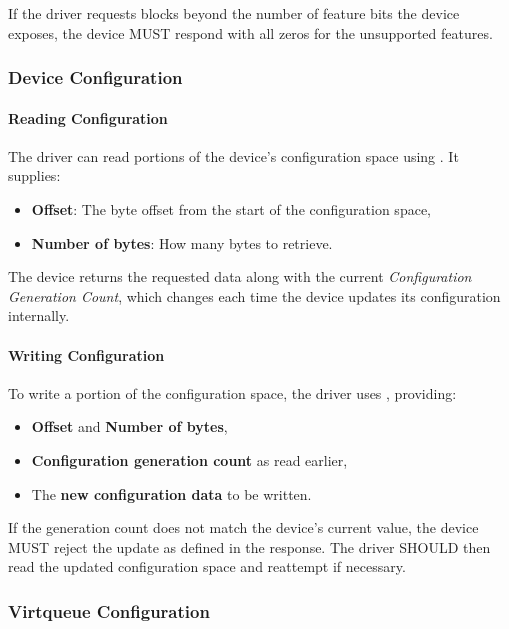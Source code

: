 If the driver requests blocks beyond the number of feature bits the device
exposes, the device MUST respond with all zeros for the unsupported
features.

\subsubsection{Device Configuration}
\label{sec:Virtio Transport Options / Virtio Over Messages / Device Initialization / Device Configuration}

\paragraph{Reading Configuration}

The driver can read portions of the device's configuration space using
. It supplies:
\begin{itemize}
  \item \textbf{Offset}: The byte offset from the start of the configuration
    space,
  \item \textbf{Number of bytes}: How many bytes to retrieve.
\end{itemize}
The device returns the requested data along with the current \emph{Configuration
Generation Count}, which changes each time the device updates its configuration
internally.

\paragraph{Writing Configuration}

To write a portion of the configuration space, the driver uses
, providing:
\begin{itemize}
  \item \textbf{Offset} and \textbf{Number of bytes},
  \item \textbf{Configuration generation count} as read earlier,
  \item The \textbf{new configuration data} to be written.
\end{itemize}

If the generation count does not match the device's current value, the device
MUST reject the update as defined in the  response.
The driver SHOULD then read the updated configuration space and
reattempt if necessary.

\subsubsection{Virtqueue Configuration}
\label{sec:Virtio Transport Options / Virtio Over Messages / Device Initialization / Virtqueue Configuration}

